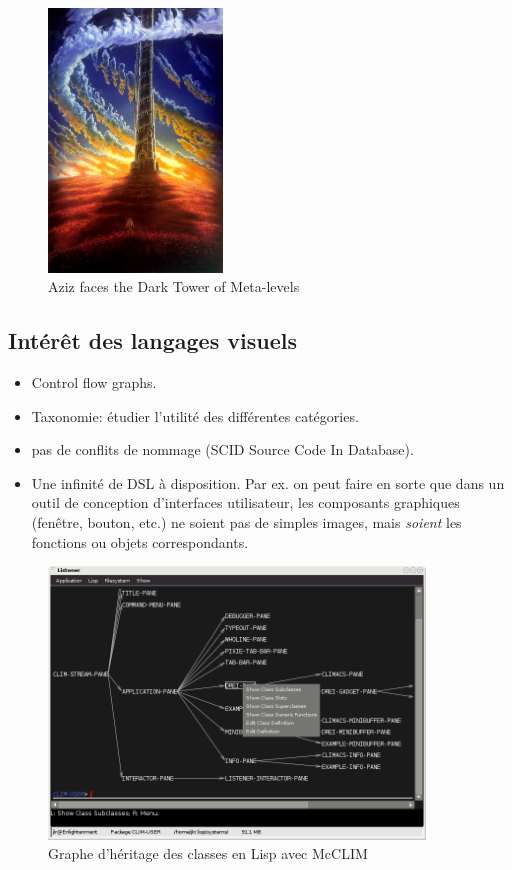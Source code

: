 \documentclass{article}
\begin{document}
\begin{figure}[htbp]
  \centering
  \includegraphics[height=7cm]{dark-tower-of-meta-levels}
  \caption{Aziz faces the Dark Tower of Meta-levels}%
\label{fig:dark-tower-meta-levels}
\end{figure}

\subsection{Intérêt des langages visuels}
\begin{itemize}
\item Control flow graphs.
\item Taxonomie: étudier l'utilité des différentes catégories.
\item pas de conflits de nommage (SCID Source Code In Database).
\item Une infinité de DSL à disposition. Par ex. on peut faire en sorte que dans un outil de conception d'interfaces utilisateur, les
  composants graphiques (fenêtre, bouton, etc.) ne soient pas de simples images, mais \emph{soient} les fonctions ou objets correspondants.
\end{itemize}

\begin{figure}[h!]
  \centering
  \includegraphics[width=10cm]{lisp-class-graph}
  \caption{Graphe d'héritage des classes en Lisp avec McCLIM}
\label{fig:lisp-class-graph}
\end{figure}
\end{document}
